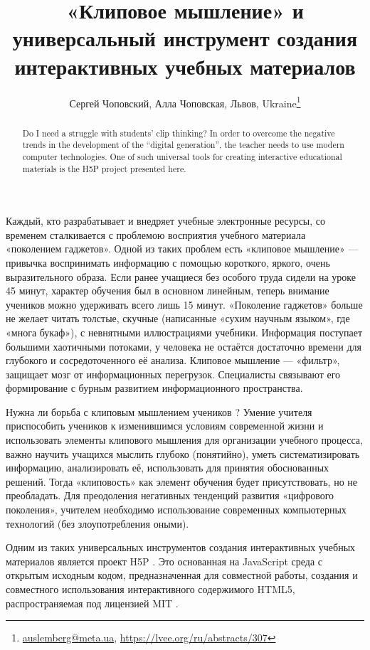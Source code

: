 \documentclass[10pt, a5paper]{article}
\begin{document}
\title{«Клиповое мышление» и универсальный инструмент создания интерактивных учебных материалов}
\author{Сергей Чоповский, Алла Чоповская, Львов, Ukraine\footnote{\url{auslemberg@meta.ua}, \url {https://lvee.org/ru/abstracts/307}}}
\maketitle
\begin{abstract}
Do I need a struggle with students' clip thinking? In order to overcome the negative trends in the development of the “digital generation”, the teacher needs to use modern computer technolo\-gies. One of such universal tools for creating interactive educati\-onal materials is the H5P project presented here.
\end{abstract}
Каждый, кто разрабатывает и внедряет учебные электронные ресурсы, со временем сталкивается с проблемою восприятия учебного материала «поколением гаджетов». Одной из таких проблем есть «клиповое мышление» \cite{bib1} — привычка воспринимать информацию с помощью короткого, яркого, очень выразительного образа. Если ранее учащиеся без особого труда сидели на уроке 45 минут, характер обучения был в основном линейным, теперь внимание учеников можно удерживать всего лишь 15 минут. «Поколение гаджетов» больше не желает читать толстые, скучные (написанные «сухим научным языком», где «многа букаф»), с невнятными иллюстрациями учебники. Информация поступает большими хаотичными потоками, у человека не остаётся достаточно времени для глубокого и сосредоточенного её анализа. Клиповое мышление — «фильтр», защищает мозг от информационных перегрузок.  Специалисты связывают его формирование с бурным развитием информационного пространства.

Нужна ли борьба с клиповым мышлением учеников \cite{bib2}?
Умение учителя приспособить учеников к изменившимся условиям современной жизни и использовать элементы клипового мышления для организации учебного процесса, важно научить учащихся мыслить глубоко (понятийно), уметь систематизировать информацию, анализировать её, использовать для принятия обоснованных решений. Тогда «клиповость» как элемент обучения будет присутствовать, но не преобладать. Для преодоления негативных тенденций развития «цифрового поколения», учителем необходимо использование современных компьютерных технологий (без злоупотребления оными).

Одним из таких универсальных инструментов создания интерактивных учебных материалов является проект H5P \cite{bib3}. Это основанная на JavaScript среда с открытым исходным кодом, предназначенная для совместной работы, создания и совместного использования интерактивного содержимого HTML5, распространяемая под лицензией MIT \cite{bib4}.
\end{document}
